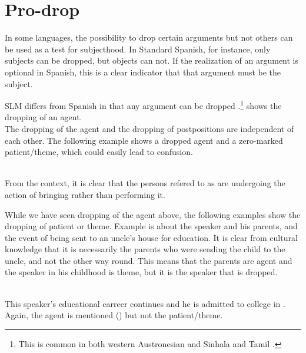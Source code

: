 \section{Pro-drop}\label{sec:grel:Pro-drop}
In some languages, the possibility to drop certain arguments but not others can be used as a test for subjecthood. In Standard Spanish, for instance, only subjects can be dropped, but objects can not. If the realization of an argument is optional in Spanish, this is a clear indicator that that argument must be the subject.

SLM differs from Spanish in that any argument can be dropped \citep{SmithEtAl2004}.\footnote{This is common in both western Austronesian \citep[171]{Himmelmann2005typochar} and Sinhala \citep[813]{Gair2003} and Tamil \citep[367]{Lehmann1989}.}  shows the dropping of an agent.
 \\
The dropping of the agent and the dropping of postpositions are independent of each other. The following example shows a dropped agent and a zero-marked patient/theme, which could easily lead to confusion.

 \\
From the context, it is clear that the persons refered to as  are undergoing the action of bringing rather than performing it.

While we have seen dropping of the agent above, the following examples show the dropping of patient or theme. Example  is about the speaker and his parents, and the event of being sent to an uncle's house for education. It is clear from cultural knowledge that it is necessarily the parents who were sending the child to the uncle, and not the other way round. This means that the parents are agent and the speaker in his childhood is theme, but it is the speaker that is dropped.

 \\
This speaker's educational carreer continues and he is admitted to college in . Again, the agent is mentioned () but not the patient/theme.

